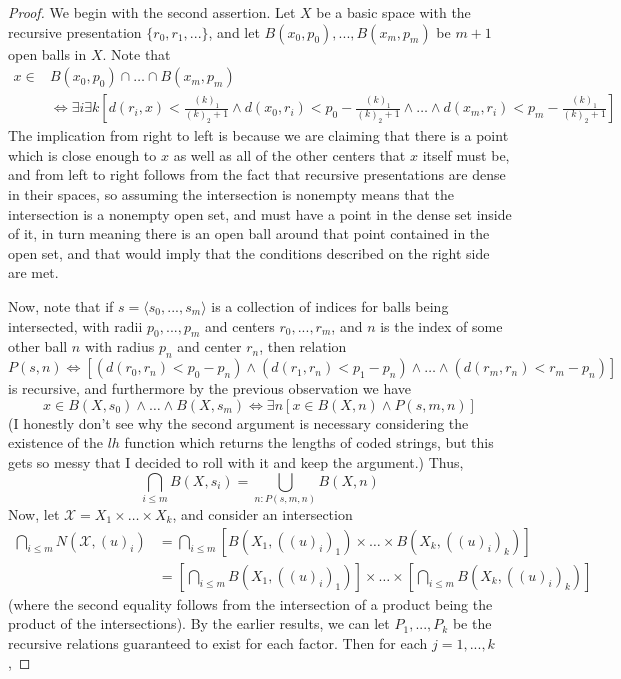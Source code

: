 \documentclass{article}
\theoremstyle{definition}
\theoremstyle{plain}
\begin{document}
\begin{proof}
	We begin with the second assertion. Let $X$ be a basic space with the recursive presentation $\{r_0,r_1,...\}$, and let $B(x_0,p_0),...,B(x_m,p_m)$ be $m+1$ open balls in $X$. 
	Note that
	\begin{align}
		x \in & B(x_0,p_0) \cap \ldots \cap B(x_m,p_m) \\
		 &\iff \exists i \exists k [d(r_i,x) < \frac{(k)_1}{(k)_2+1} 
		\wedge d(x_0,r_i) < p_0 - \frac{(k)_1}{(k)_2+1} \wedge \ldots 
		\wedge d(x_m,r_i) < p_m - \frac{(k)_1}{(k)_2+1}]
	\end{align}
The implication from right to left is because we are claiming that there is a point which is close enough to $x$ as well as all of the other centers that $x$ itself must be, and from left to right follows from the fact that recursive presentations are dense in their spaces, so assuming the intersection is nonempty means that the intersection is a nonempty open set, and must have a point in the dense set inside of it, in turn meaning there is an open ball around that point contained in the open set, and that would imply that the conditions described on the right side are met. 
\par Now, note that if $s = \langle s_0,...,s_m \rangle$ is a collection of indices for balls being intersected, with radii $p_0,...,p_m$ and centers $r_0,...,r_m$, and $n$ is the index of some other ball $n$ with radius $p_n$ and center $r_n$, then relation
\[ P(s,n) \iff \left[ (d(r_0,r_n) < p_0 - p_n) \wedge (d(r_1,r_n) < p_1 - p_n) \wedge \ldots \wedge (d(r_m,r_n) < r_m - p_n) \right] \]
is recursive, and furthermore by the previous observation we have 
\[ x \in B(X,s_0) \wedge \ldots \wedge B(X,s_m) \iff \exists n [x \in B(X,n) \wedge P(s,m,n)] \]
(I honestly don't see why the second argument is necessary considering the existence of the $lh$ function which returns the lengths of coded strings, but this gets so messy that I decided to roll with it and keep the argument.) Thus,
\[ \bigcap_{i \leq m}B(X,s_i) = \bigcup_{n: P(s,m,n)} B(X,n) \]
Now, let $\mathcal{X} = X_1 \times \ldots \times X_k$, and consider an intersection
\begin{align}
	\bigcap_{i \leq m} N(\mathcal{X},(u)_i) &= \bigcap_{i \leq m} [B(X_1,((u)_i)_1) \times \ldots \times B(X_k,((u)_i)_k)] \\
		&= \left[ \bigcap_{i \leq m} B(X_1,((u)_i)_1)\right] \times \ldots \times \left[ \bigcap_{i \leq m} B(X_k,((u)_i)_k)\right]
\end{align} 
(where the second equality follows from the intersection of a product being the product of the intersections). By the earlier results, we can let $P_1,...,P_k$ be the recursive relations guaranteed to exist for each factor. Then for each $j = 1,...,k$,

\end{proof}
\end{document}
